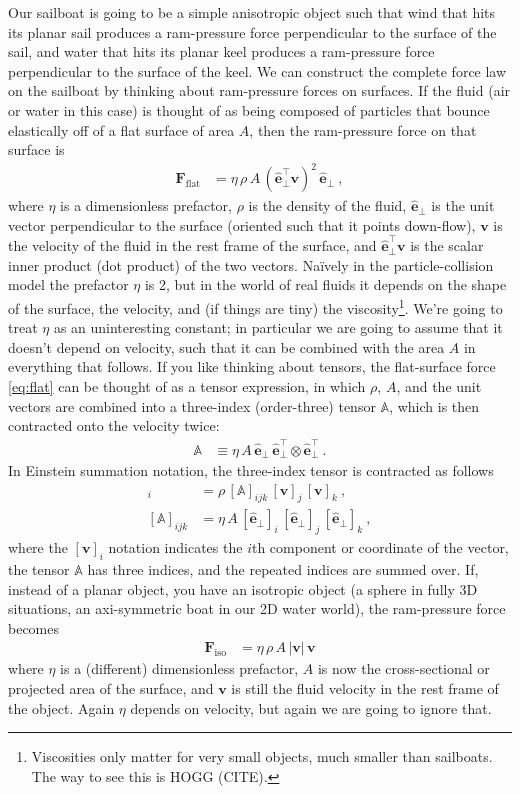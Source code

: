 \documentclass{article}
\renewcommand{\vec}[1]{\boldsymbol{#1}}
\newcommand{\uvec}{\vec{\hat{e}}}
\newcommand{\tensor}[1]{\mathbb{#1}}
\renewcommand{\flat}{\text{flat}}
\newcommand{\iso}{\text{iso}}
\begin{document}
Our sailboat is going to be a simple anisotropic object such that wind that hits its planar sail produces a ram-pressure force perpendicular to the surface of the sail,
and water that hits its planar keel produces a ram-pressure force perpendicular to the surface of the keel.
We can construct the complete force law on the sailboat by thinking about ram-pressure forces on surfaces.
If the fluid (air or water in this case) is thought of as being composed of particles that bounce elastically off of a flat surface of area $A$, then the ram-pressure force on that surface is
\begin{align}\label{eq:flat}
    \vec{F}_\flat &= \eta\,\rho\,A\,(\uvec_\perp^\top\vec{v})^2\,\uvec_\perp ~,
\end{align}
where $\eta$ is a dimensionless prefactor, $\rho$ is the density of the fluid, $\uvec_\perp$ is the unit vector perpendicular to the surface (oriented such that it points down-flow), $\vec{v}$ is the velocity of the fluid in the rest frame of the surface, and $\uvec_\perp^\top\vec{v}$ is the scalar inner product (dot product) of the two vectors.
Na\"ively in the particle-collision model the prefactor $\eta$ is 2, but in the world of real fluids it depends on the shape of the surface, the velocity, and (if things are tiny) the viscosity\footnote{%
Viscosities only matter for very small objects, much smaller than sailboats. The way to see this is HOGG (CITE).}.
We're going to treat $\eta$ as an uninteresting constant; in particular we are going to assume that it doesn't depend on velocity, such that it can be combined with the area $A$ in everything that follows.
If you like thinking about tensors, the flat-surface force \eqref{eq:flat}  can be thought of as a tensor expression, in which $\rho$, $A$, and the unit vectors are combined into a three-index (order-three) tensor $\tensor{A}$, which is then contracted onto the velocity twice:
\begin{align}
    \tensor{A} &\equiv \eta\,A\,\uvec_\perp\,\uvec_\perp^\top\otimes\uvec_\perp^\top ~.
\end{align}
In Einstein summation notation, the three-index tensor is contracted as follows
\begin{align}
    [\vec{F}_\flat]_i &= \rho\,[\tensor{A}]_{ijk}\,[\vec{v}]_j\,[\vec{v}]_k ~,
    \\
    [\tensor{A}]_{ijk} &= \eta\,A\,[\uvec_\perp]_i\,[\uvec_\perp]_j\,[\uvec_\perp]_k
    ~,
\end{align}
where the $[\vec{v}]_i$ notation indicates the $i$th component or coordinate of the vector, the tensor $\tensor{A}$ has three indices, and the repeated indices are summed over.
If, instead of a planar object, you have an isotropic object (a sphere in fully 3D situations, an axi-symmetric boat in our 2D water world), the ram-pressure force becomes
\begin{align}\label{eq:iso}
    \vec{F}_\iso &= \eta\,\rho\,A\,|\vec{v}|\,\vec{v}
\end{align}
where $\eta$ is a (different) dimensionless prefactor, $A$ is now the cross-sectional or projected area of the surface, and $\vec{v}$ is still the fluid velocity in the rest frame of the object.
Again $\eta$ depends on velocity, but again we are going to ignore that.
\end{document}
